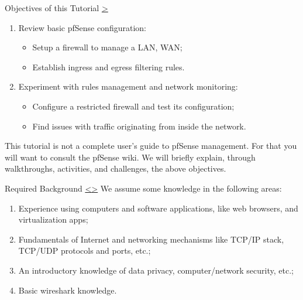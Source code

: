 \documentclass[12pt]{extarticle}
\newenvironment{instructionblock}{\Large\bgroup}{\egroup}
\newcommand{\ben}{\begin{enumerate}}
\newcommand{\een}{\end{enumerate}}
\begin{document}





\begin{slide}{ Objectives of this Tutorial }{ \hyperref[slide 2]{\textgreater} }
	\begin{instructionblock}
		\ben
			\item Review basic pfSense configuration:
			\begin{itemize}
			\item Setup a firewall to manage a LAN, WAN;
			\item Establish ingress and egress filtering rules.
			\end{itemize}
			
			\item Experiment with rules management and network monitoring:
			\begin{itemize}
			\item Configure a restricted firewall and test its configuration;
			\item Find issues with traffic originating from inside the network.
			\end{itemize}
		\een
	\end{instructionblock}
\end{slide}


\vspace{8mm}
\noindent
This tutorial is not a complete user's guide to pfSense management. For that you will want to consult the pfSense wiki. We will briefly explain, through walkthroughs, activities, and challenges, the above objectives.







\pagebreak	
\begin{slide}{ Required Background }{ \hyperref[slide 1]{\textless}\hyperref[slide 3]{\textgreater} }
	\begin{instructionblock}
		We assume some knowledge in the following areas:
		\begin{enumerate}
			\item Experience using computers and software applications, like web browsers, and virtualization apps;
			\item Fundamentals of Internet and networking mechanisms like TCP/IP stack, TCP/UDP protocols and ports, etc.;
			\item An introductory knowledge of data privacy, computer/network security, etc.;
			\item Basic wireshark knowledge.
		\end{enumerate}
	\end{instructionblock}
\end{slide}
\end{document}
